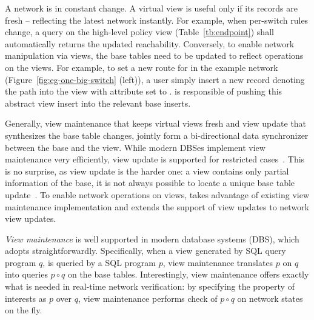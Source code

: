 A network is in constant change. A virtual view is useful only if its
records are fresh -- reflecting the latest network instantly. For
example, when per-switch rules change, a query on the high-level
policy view  (Table~\ref{tb:endpoint}) shall
automatically returns the updated  reachability. Conversely,
to enable network manipulation via views, the base tables need to be
updated to reflect operations on the views.  For example, to set a new
route  for  in the example network
(Figure~\ref{fig:eg-one-big-switch} (left)), a user simply insert a new
record denoting the path into the  view with
 attribute set to . \Sys is responsible of pushing this
abstract view insert into the relevant base 
inserts.

Generally, view maintenance that keeps virtual views fresh and view
update that synthesizes the base table changes, jointly form a
bi-directional data synchronizer between the base and the view. While
modern DBSes implement view maintenance very efficiently, view update
is supported for restricted
cases~\cite{ak-view-udpate-thesis,relational-lenses}. This is no
surprise, as view update is the harder one: a view contains only partial
information of the base, it is not always possible to locate a unique
base table update~\cite{Bancilhon:view-update-semantics}. To enable
network operations on views, \Sys takes advantage of existing view
maintenance implementation and extends the support of view updates to
network view updates.

\textit{View maintenance} is well supported in modern database systems
(DBS), which \Sys adopts straightforwardly. Specifically, when a view
generated by SQL query program $q$, is queried by a SQL program $p$,
view maintenance translates $p$ on $q$ into queries $p \circ q$ on the
base tables.
Interestingly, view maintenance offers exactly what is needed in
real-time network verification: by specifying the property of interests
as $p$ over $q$, view maintenance performs check of $p \circ q$ on
network states on the fly. %

